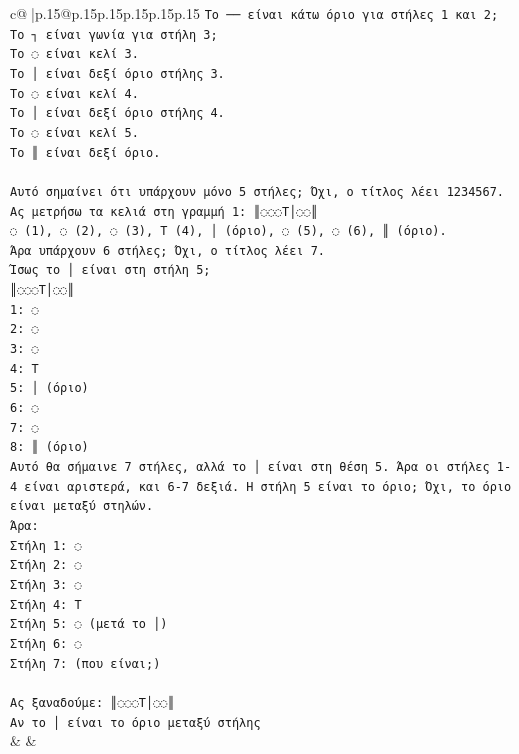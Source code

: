 \documentclass{article}
\begin{document}
{\begin{supertabular}{c@{$\;$}|p{.15\linewidth}@{}p{.15\linewidth}p{.15\linewidth}p{.15\linewidth}p{.15\linewidth}p{.15\linewidth}}
{{{\texttt{Το ── είναι κάτω όριο για στήλες 1 και 2;} \\
\texttt{Το ┐ είναι γωνία για στήλη 3;} \\
\texttt{Το ◌ είναι κελί 3.} \\
\texttt{Το │ είναι δεξί όριο στήλης 3.} \\
\texttt{Το ◌ είναι κελί 4.} \\
\texttt{Το │ είναι δεξί όριο στήλης 4.} \\
\texttt{Το ◌ είναι κελί 5.} \\
\texttt{Το ║ είναι δεξί όριο.} \\
\\ 
\texttt{Αυτό σημαίνει ότι υπάρχουν μόνο 5 στήλες; Όχι, ο τίτλος λέει 1234567.} \\
\texttt{Ας μετρήσω τα κελιά στη γραμμή 1: ║◌◌◌T│◌◌║} \\
\texttt{◌ (1), ◌ (2), ◌ (3), T (4), │ (όριο), ◌ (5), ◌ (6), ║ (όριο).} \\
\texttt{Άρα υπάρχουν 6 στήλες; Όχι, ο τίτλος λέει 7.} \\
\texttt{Ίσως το │ είναι στη στήλη 5;} \\
\texttt{║◌◌◌T│◌◌║} \\
\texttt{1: ◌} \\
\texttt{2: ◌} \\
\texttt{3: ◌} \\
\texttt{4: T} \\
\texttt{5: │ (όριο)} \\
\texttt{6: ◌} \\
\texttt{7: ◌} \\
\texttt{8: ║ (όριο)} \\
\texttt{Αυτό θα σήμαινε 7 στήλες, αλλά το │ είναι στη θέση 5. Άρα οι στήλες 1{-}4 είναι αριστερά, και 6{-}7 δεξιά. Η στήλη 5 είναι το όριο; Όχι, το όριο είναι μεταξύ στηλών.} \\
\texttt{Άρα:} \\
\texttt{Στήλη 1: ◌} \\
\texttt{Στήλη 2: ◌} \\
\texttt{Στήλη 3: ◌} \\
\texttt{Στήλη 4: T} \\
\texttt{Στήλη 5: ◌ (μετά το │)} \\
\texttt{Στήλη 6: ◌} \\
\texttt{Στήλη 7: (που είναι;)} \\
\\ 
\texttt{Ας ξαναδούμε: ║◌◌◌T│◌◌║} \\
\texttt{Αν το │ είναι το όριο μεταξύ στήλης} \\
            }
        }
    }
    & & \\ \\


\end{supertabular}}
\end{document}
